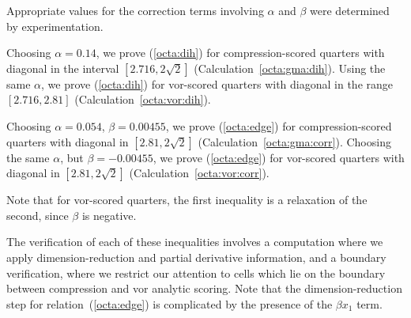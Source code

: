 Appropriate values for the correction terms involving
$\alpha$ and $\beta$ were determined by experimentation.



Choosing $\alpha = 0.14$, we prove (\ref{octa:dih}) for compression-scored
quarters with diagonal in the interval $[2.716, 2\sqrt{2}]$
(Calculation~\ref{octa:gma:dih}).  Using
the same $\alpha$, we prove (\ref{octa:dih}) for vor-scored
quarters with diagonal in the range $[2.716, 2.81]$ (Calculation~\ref{octa:vor:dih}).

Choosing $\alpha = 0.054$, $\beta = 0.00455$, we prove (\ref{octa:edge}) for
compression-scored quarters with diagonal in $[2.81, 2\sqrt{2}]$
(Calculation~\ref{octa:gma:corr}).  Choosing
the same $\alpha$, but $\beta = -0.00455$, we prove (\ref{octa:edge}) for
vor-scored quarters with diagonal in $[2.81, 2\sqrt{2}]$
(Calculation~\ref{octa:vor:corr}).


Note that for vor-scored quarters,
the first inequality is a relaxation of the second, since $\beta$ is
negative.

The verification of each of these inequalities involves
a computation where we apply dimension-reduction
and partial derivative information, and
a boundary verification, where
we restrict our attention to cells which lie on the boundary between
compression and vor analytic scoring.
Note that the
dimension-reduction step for relation~(\ref{octa:edge}) is complicated
by the presence of the $\beta x_1$ term.


